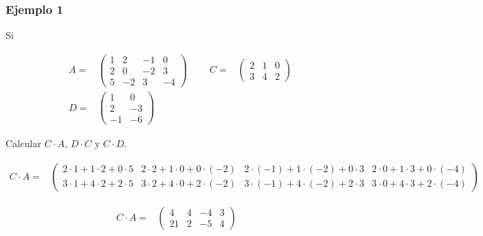 \documentclass[
]{article}
\begin{document}
\hypertarget{ejemplo-1-1}{%
\subsubsection{Ejemplo 1}\label{ejemplo-1-1}}

Si

\begin{equation*}
  \begin{array}{ccccc}
    A = & \begin{pmatrix} 1 & 2 & -1 & 0  \\ 2 & 0 & -2 & 3 \\ 5 & -2 & 3 & -4 \end{pmatrix} &\,\,\,\, &  
    C = & \begin{pmatrix} 2 & 1 & 0  \\ 3 & 4 & 2 \end{pmatrix}  \\
    D = &  \begin{pmatrix} 1 & 0 \\ 2 & -3 \\ -1 & -6 \end{pmatrix}  
  \end{array}
\end{equation*}

Calcular \(C\cdot A\), \(D\cdot C\) y \(C\cdot D\).

\begin{equation*}
  \begin{array}{ccc}
    C\cdot A = & \begin{pmatrix} 2\cdot 1 + 1\cdot 2 + 0\cdot 5 & 2\cdot 2 + 1\cdot 0 + 0\cdot(-2) & 2\cdot(-1) + 1\cdot(-2) + 0\cdot 3 & 2\cdot 0 + 1\cdot 3 + 0\cdot(-4)  \\ 3\cdot 1 + 4\cdot 2 + 2\cdot 5 & 3\cdot 2 + 4\cdot 0 + 2\cdot(-2) & 3\cdot(-1) + 4\cdot(-2) + 2\cdot 3 & 3\cdot 0 + 4\cdot 3 + 2\cdot(-4) \end{pmatrix} &    
  \end{array}
\end{equation*}

\begin{equation*}
  \begin{array}{ccc}
    C\cdot A = & \begin{pmatrix} 
                          4 & 4 & -4 & 3  \\
                         21 & 2 & -5 & 4 
                  \end{pmatrix} &    
  \end{array}
\end{equation*}
\end{document}
